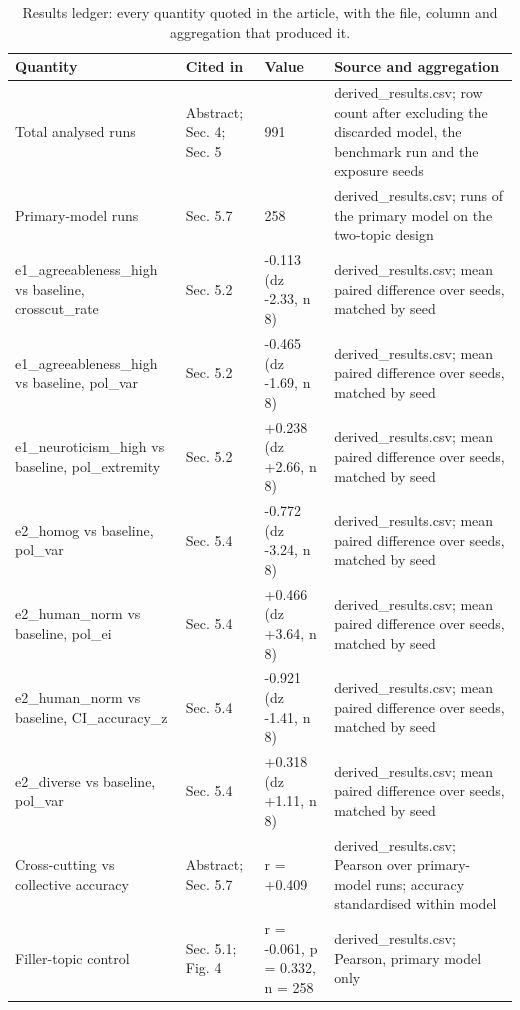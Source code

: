 \begin{table}[t]\centering
\scriptsize
\setlength{\tabcolsep}{3pt}
\caption{Results ledger: every quantity quoted in the article, with the file, column and aggregation that produced it.}
\label{tab:ledger}
\begin{tabular}{@{}p{4.0cm}p{2.0cm}p{3.1cm}p{4.2cm}@{}}
\toprule
Quantity & Cited in & Value & Source and aggregation \\
\midrule
Total analysed runs & Abstract; Sec. 4; Sec. 5 & 991 & derived\_results.csv; row count after excluding the discarded model, the benchmark run and the exposure seeds \\[2pt]
Primary-model runs & Sec. 5.7 & 258 & derived\_results.csv; runs of the primary model on the two-topic design \\[2pt]
e1\_agreeableness\_high vs baseline, crosscut\_rate & Sec. 5.2 & -0.113 (dz -2.33, n 8) & derived\_results.csv; mean paired difference over seeds, matched by seed \\[2pt]
e1\_agreeableness\_high vs baseline, pol\_var & Sec. 5.2 & -0.465 (dz -1.69, n 8) & derived\_results.csv; mean paired difference over seeds, matched by seed \\[2pt]
e1\_neuroticism\_high vs baseline, pol\_extremity & Sec. 5.2 & +0.238 (dz +2.66, n 8) & derived\_results.csv; mean paired difference over seeds, matched by seed \\[2pt]
e2\_homog vs baseline, pol\_var & Sec. 5.4 & -0.772 (dz -3.24, n 8) & derived\_results.csv; mean paired difference over seeds, matched by seed \\[2pt]
e2\_human\_norm vs baseline, pol\_ei & Sec. 5.4 & +0.466 (dz +3.64, n 8) & derived\_results.csv; mean paired difference over seeds, matched by seed \\[2pt]
e2\_human\_norm vs baseline, CI\_accuracy\_z & Sec. 5.4 & -0.921 (dz -1.41, n 8) & derived\_results.csv; mean paired difference over seeds, matched by seed \\[2pt]
e2\_diverse vs baseline, pol\_var & Sec. 5.4 & +0.318 (dz +1.11, n 8) & derived\_results.csv; mean paired difference over seeds, matched by seed \\[2pt]
Cross-cutting vs collective accuracy & Abstract; Sec. 5.7 & r = +0.409 & derived\_results.csv; Pearson over primary-model runs; accuracy standardised within model \\[2pt]
Filler-topic control & Sec. 5.1; Fig. 4 & r = -0.061, p = 0.332, n = 258 & derived\_results.csv; Pearson, primary model only \\[2pt]

\end{tabular}
\end{table}
